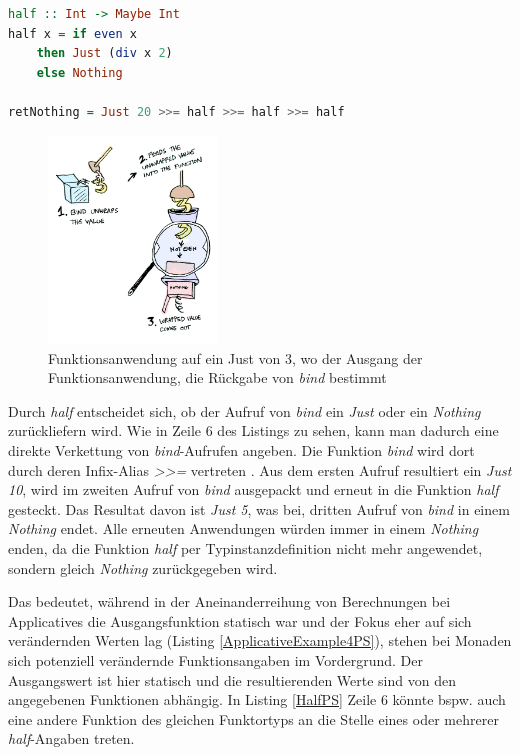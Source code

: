 \documentclass[
12pt,
ngerman,
oneside]
{scrbook} %
\begin{document}
\begin{lstlisting}[language=purescript, style=numbered-and-boxed, caption=Funktion mit Monad-Anwendung, label=HalfPS]
half :: Int -> Maybe Int
half x = if even x
	then Just (div x 2)
	else Nothing

retNothing = Just 20 >>= half >>= half >>= half
\end{lstlisting}

\begin{figure}
	\centering
	\includegraphics[width=0.4\textwidth]{Pictures/monad-just.png}
	\caption{Funktionsanwendung auf ein Just von 3, wo der Ausgang der Funktionsanwendung, die Rückgabe von \emph{bind} bestimmt \cite[][]{AdityaBhargava13}}
	\label{fig:MaybeMonadJust}
\end{figure}

Durch \emph{half} entscheidet sich, ob der Aufruf von \emph{bind} ein \emph{Just} oder ein \emph{Nothing} zurückliefern wird. Wie in Zeile 6 des Listings zu sehen, kann man dadurch eine direkte Verkettung von \emph{bind}-Aufrufen angeben. Die Funktion \emph{bind} wird dort durch deren Infix-Alias \emph{>>=} vertreten \cite[][S. 101]{Freeman17}. Aus dem ersten Aufruf resultiert ein \emph{Just 10}, wird im zweiten Aufruf von \emph{bind} ausgepackt und erneut in die Funktion \emph{half} gesteckt. Das Resultat davon ist \emph{Just 5}, was bei, dritten Aufruf von \emph{bind} in einem \emph{Nothing} endet. Alle erneuten Anwendungen würden immer in einem \emph{Nothing} enden, da die Funktion \emph{half} per Typinstanzdefinition nicht mehr angewendet, sondern gleich \emph{Nothing} zurückgegeben wird.

Das bedeutet, während in der Aneinanderreihung von Berechnungen bei Applicatives die Ausgangsfunktion statisch war und der Fokus eher auf sich verändernden Werten lag (Listing \ref{ApplicativeExample4PS}), stehen bei Monaden sich potenziell verändernde Funktionsangaben im Vordergrund. Der Ausgangswert ist hier statisch und die resultierenden Werte sind von den angegebenen Funktionen abhängig. In Listing \ref{HalfPS} Zeile 6 könnte bspw. auch eine andere Funktion des gleichen Funktortyps an die Stelle eines oder mehrerer \emph{half}-Angaben treten.
\end{document}
